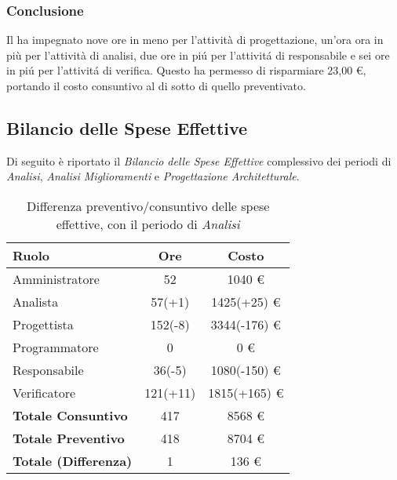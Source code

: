 \subsubsection{Conclusione}
Il  ha impegnato nove ore in meno per l'attivit\`a di progettazione, un'ora ora in più per l'attivit\`a di analisi, due ore in pi\'u per l'attivit\'a di responsabile e sei ore in pi\'u per l'attivit\'a di verifica. Questo ha permesso di risparmiare 23,00 \euro{}, portando il costo consuntivo al di sotto di quello preventivato.

\subsection{Bilancio delle Spese Effettive}
Di seguito è riportato il \textit{Bilancio delle Spese Effettive} complessivo dei periodi di \textit{Analisi}, \textit{Analisi Miglioramenti} e \textit{Progettazione Architetturale}.

\begin{table}[H]
	\centering
	\begin{tabular}{ l c c }
		\textbf{Ruolo} & \textbf{Ore} & \textbf{Costo} \\
		\hline
		Amministratore & 52 & 1040 \euro{} \\
		Analista & 57(+1) & 1425(+25) \euro{} \\
		Progettista & 152(-8) & 3344(-176) \euro{} \\
		Programmatore & 0 & 0 \euro{} \\
		Responsabile & 36(-5) & 1080(-150) \euro{} \\
		Verificatore & 121(+11) & 1815(+165) \euro{} \\
		\hline
		\textbf{Totale Consuntivo} & 417 & 8568 \euro{} \\
		\hline
		\textbf{Totale Preventivo} & 418 & 8704 \euro{} \\
		\hline
		\textbf{Totale (Differenza)} & 1 & 136 \euro{} \\
		\hline
	\end{tabular}
	\caption{Differenza preventivo/consuntivo delle spese effettive, con il periodo di \textit{Analisi}}
\end{table}

